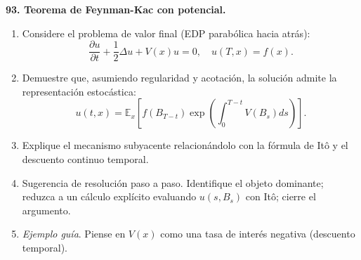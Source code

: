 \documentclass[11pt, letterpaper]{article}
\begin{document}
\begin{ejercicio}
    \textbf{93. Teorema de Feynman-Kac con potencial.}
    \begin{enumerate}
        \item Considere el problema de valor final (EDP parabólica hacia atrás):
        \[ \frac{\partial u}{\partial t} + \frac{1}{2}\Delta u + V(x)u = 0, \quad u(T,x) = f(x). \]
        \item Demuestre que, asumiendo regularidad y acotación, la solución admite la representación estocástica:
        \[ u(t,x) = \mathbb{E}_x\left[ f(B_{T-t}) \exp\left( \int_0^{T-t} V(B_s) ds \right) \right]. \]
        \item Explique el mecanismo subyacente relacionándolo con la fórmula de Itô y el descuento continuo temporal.
        \item Sugerencia de resolución paso a paso. Identifique el objeto dominante; reduzca a un cálculo explícito evaluando $u(s, B_s)$ con Itô; cierre el argumento.
        \item \textit{Ejemplo guía}. Piense en $V(x)$ como una tasa de interés negativa (descuento temporal).
    \end{enumerate}
\end{ejercicio}

\vspace{5mm}
\end{document}

